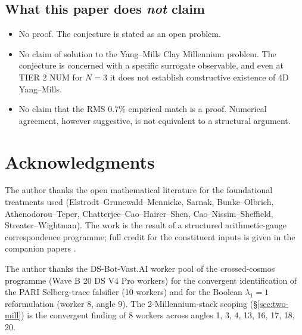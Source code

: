 \documentclass[11pt,a4paper,reqno]{amsart}
\theoremstyle{definition}
\begin{document}
\subsection{What this paper does \emph{not} claim}\label{ss:not-claim}

\begin{itemize}[leftmargin=2em]
   \item No proof. The conjecture is stated as an open problem.
   \item No claim of solution to the Yang--Mills Clay Millennium problem. The conjecture is concerned with a specific surrogate observable, and even at TIER 2 NUM for $N=3$ it does not establish constructive existence of 4D Yang--Mills.
   \item No claim that the RMS $0.7\%$ empirical match is a proof. Numerical agreement, however suggestive, is not equivalent to a structural argument.
\end{itemize}

\section{Acknowledgments}\label{sec:acks}

The author thanks the open mathematical literature for the foundational treatments used (Elstrodt--Grunewald--Mennicke, Sarnak, Bunke--Olbrich, Athenodorou--Teper, Chatterjee--Cao--Hairer--Shen, Cao--Nissim--Sheffield, Streater--Wightman). The work is the result of a structured arithmetic-gauge correspondence programme; full credit for the constituent inputs is given in the companion papers \cite{Remondiere2026Selberg, Remondiere2026CenterRank, Remondiere2026CR, Remondiere2026RouteB}.

The author thanks the DS-Bot-Vast.AI worker pool of the crossed-cosmos programme (Wave B 20 DS V4 Pro workers) for the convergent identification of the PARI Selberg-trace falsifier (10 workers) and for the Boolean $\lambda_1 = 1$ reformulation (worker 8, angle 9). The 2-Millennium-stack scoping (\S\ref{sec:two-mill}) is the convergent finding of 8 workers across angles 1, 3, 4, 13, 16, 17, 18, 20.



\end{document}
